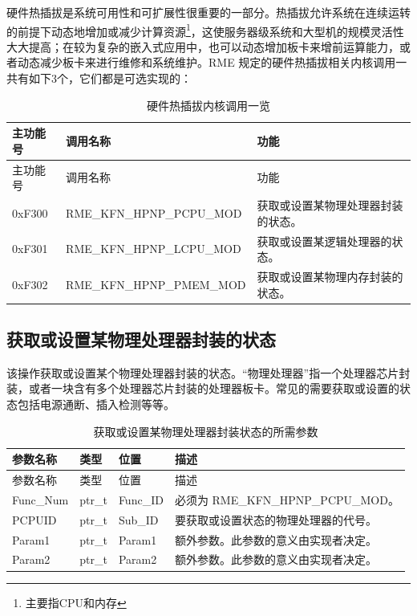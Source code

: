 硬件热插拔是系统可用性和可扩展性很重要的一部分。热插拔允许系统在连续运转的前提下动态地增加或减少计算资源\footnote{主要指CPU和内存}，这使服务器级系统和大型机的规模灵活性大大提高；在较为复杂的嵌入式应用中，也可以动态增加板卡来增前运算能力，或者动态减少板卡来进行维修和系统维护。RME 规定的硬件热插拔相关内核调用一共有如下3个，它们都是可选实现的：

\begin{xltabular}{\textwidth}{@{}>{\hsize\raggedright\arraybackslash}X>{\hsize\raggedright\arraybackslash}X>{\hsize\raggedright\arraybackslash}X@{}}
\caption{硬件热插拔内核调用一览}\label{tab:8-35-hardware-hotplug-kernel-calls}\\
\toprule
主功能号 & 调用名称 & 功能\tabularnewline
\endfirsthead
\toprule
主功能号 & 调用名称 & 功能\tabularnewline
\midrule
\endhead
\bottomrule
\endlastfoot
0xF300 & RME\_KFN\_HPNP\_PCPU\_MOD &
获取或设置某物理处理器封装的状态。\tabularnewline
0xF301 & RME\_KFN\_HPNP\_LCPU\_MOD &
获取或设置某逻辑处理器的状态。\tabularnewline
0xF302 & RME\_KFN\_HPNP\_PMEM\_MOD &
获取或设置某物理内存封装的状态。\tabularnewline
\end{xltabular}

\subsection{获取或设置某物理处理器封装的状态}\label{subsec:8-get-or-set-physical-processor-package-state}

该操作获取或设置某个物理处理器封装的状态。``物理处理器''指一个处理器芯片封装，或者一块含有多个处理器芯片封装的处理器板卡。常见的需要获取或设置的状态包括电源通断、插入检测等等。

\begin{xltabular}{\textwidth}{@{}>{\hsize\raggedright\arraybackslash}X>{\hsize\raggedright\arraybackslash}X>{\hsize\raggedright\arraybackslash}X>{\hsize\raggedright\arraybackslash}X@{}}
\caption{获取或设置某物理处理器封装状态的所需参数}\label{tab:8-36-get-or-set-physical-processor-package-state-parameters}\\
\toprule
参数名称 & 类型 & 位置 & 描述\tabularnewline
\endfirsthead
\toprule
参数名称 & 类型 & 位置 & 描述\tabularnewline
\midrule
\endhead
\bottomrule
\endlastfoot
Func\_Num & ptr\_t & Func\_ID & 必须为 RME\_KFN\_HPNP\_PCPU\_MOD。\tabularnewline
PCPUID & ptr\_t & Sub\_ID &
要获取或设置状态的物理处理器的代号。\tabularnewline
Param1 & ptr\_t & Param1 &
额外参数。此参数的意义由实现者决定。\tabularnewline
Param2 & ptr\_t & Param2 &
额外参数。此参数的意义由实现者决定。\tabularnewline
\end{xltabular}

